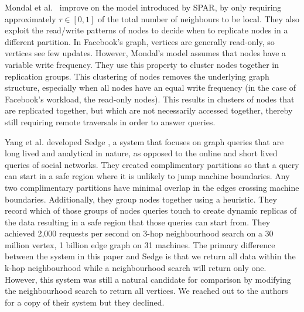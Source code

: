 Mondal et al.~\cite{Mondal12} improve on the model introduced by SPAR, by only
requiring approximately $\tau \in [0, 1]$ of the total number of neighbours to
be local. They also exploit the read/write patterns of nodes to decide when to
replicate nodes in a different partition. In Facebook's graph, vertices are
generally read-only, so vertices see few updates. However, Mondal's model
assumes that nodes have a variable write frequency. They use this property to
cluster nodes together in replication groups. This clustering of nodes removes
the underlying graph structure, especially when all nodes have an equal write
frequency (in the case of Facebook's workload, the read-only nodes). This
results in clusters of nodes that are replicated together, but which are not
necessarily accessed together, thereby still requiring remote traversals in
order to answer queries.

Yang et al. developed Sedge \cite{Yang12}, a system that focuses on graph
queries that are long lived and analytical in nature, as opposed to the online
and short lived queries of social networks. They created complimentary
partitions so that a query can start in a safe region where it is unlikely to
jump machine boundaries. Any two complimentary partitions have minimal overlap
in the edges crossing machine boundaries. Additionally, they group nodes
together using a heuristic. They record which of those groups of nodes queries
touch to create dynamic replicas of the data resulting in a safe region that
those queries can start from. They achieved 2,000 requests per second on 3-hop
neighbourhood search on a 30 million vertex, 1 billion edge graph on 31
machines. The primary difference between the system in this paper and Sedge is
that we return all data within the k-hop neighbourhood while a neighbourhood
search will return only one. However, this system was still a natural candidate
for comparison by modifying the neighbourhood search to return all vertices. We
reached out to the authors for a copy of their system but they declined.
